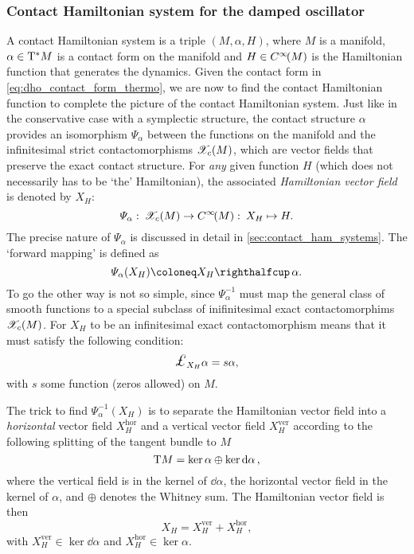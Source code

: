 \subsubsection{Contact Hamiltonian system for the damped oscillator}
A contact Hamiltonian system is a triple $(M, \alpha, H)$, where $M$ is a manifold, $\alpha \in \mathrm{T}^*M$ is a contact form on the manifold and $H \in C^\infty\!\qty(M)$ is the Hamiltonian function that generates the dynamics. Given the contact form in \cref{eq:dho_contact_form_thermo}, we are now to find the contact Hamiltonian function to complete the picture of the contact Hamiltonian system. Just like in the conservative case with a symplectic structure, the contact structure $\alpha$ provides an isomorphism $\Psi_{\alpha}$ between the functions on the manifold and the infinitesimal strict contactomorphisms $\mathscr{X}_{c}\qty(M)$, which are vector fields that preserve the exact contact structure. For \emph{any} given function $H$ (which does not necessarily has to be `the' Hamiltonian), the associated \emph{Hamiltonian vector field} is denoted by $X_H$:
\begin{equation}
    \Psi_\alpha: \: \mathscr{X}_{c}\qty(M) \to C^\infty\!\qty(M): \: X_H \mapsto H. 
\end{equation}
The precise nature of $\Psi_\alpha$ is discussed in detail in \cref{sec:contact_ham_systems}. The `forward mapping' is defined as
$$ \Psi_\alpha(X_H) \coloneq \intpr{X_H}{\alpha}. $$
To go the other way is not so simple, since $ \Psi_\alpha^{-1}$ must map the general class of smooth functions to a special subclass of inifinitesimal exact contactomorphims $\mathscr{X}_{c}\qty(M)$. For $X_H$ to be an infinitesimal exact contactomorphism means that it must satisfy the following condition:
$$ \lied{X_H}{\alpha} = s \alpha, $$
with $s$ some function (zeros allowed) on $M$.

The trick to find $\Psi_\alpha^{-1}(X_H)$ is to separate the Hamiltonian vector field into a \emph{horizontal} vector field $X^\text{hor}_H$  and a vertical vector field $X^\text{ver}_H$ according to the following splitting of the tangent bundle to $M$ \cite{Libermann1987}
$$ \mathrm{T}M = \ker \alpha \oplus \ker \dd{\alpha},$$
where the vertical field is in the kernel of $ \dd{\alpha}$, the horizontal vector field in the kernel of $\alpha$, and $\oplus$ denotes the Whitney sum. The Hamiltonian vector field is then 
$$ X_H = X_H^\text{ver} + X_H^\text{hor}, $$
with $X_H^\text{ver} \in \ker \dd{\alpha}$ and $X_H^\text{hor} \in \ker \alpha$.

